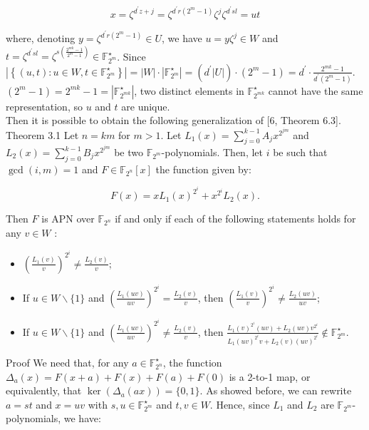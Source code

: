 \documentclass[10pt]{article}
\begin{document}
$$
x=\zeta^{d^{\prime} z+j}=\zeta^{d^{\prime} r\left(2^{m}-1\right)} \zeta^{j} \zeta^{d^{\prime} s l}=u t
$$

where, denoting $y=\zeta^{d^{\prime} r\left(2^{m}-1\right)} \in U$, we have $u=y \zeta^{j} \in W$ and $t=\zeta^{d^{\prime} s l}=\zeta^{s\left(\frac{2^{m k}-1}{2^{m}-1}\right)} \in \mathbb{F}_{2^{m}}^{\star}$. Since $\left|\left\{(u, t): u \in W, t \in \mathbb{F}_{2^{m}}^{\star}\right\}\right|=|W| \cdot\left|\mathbb{F}_{2^{m}}^{\star}\right|=\left(d^{\prime}|U|\right) \cdot\left(2^{m}-1\right)=d^{\prime} \cdot \frac{2^{m k}-1}{d^{\prime}\left(2^{m}-1\right)}$. $\left(2^{m}-1\right)=2^{m k}-1=\left|\mathbb{F}_{2^{m k}}^{\star}\right|$, two distinct elements in $\mathbb{F}_{2^{m k}}^{\star}$ cannot have the same representation, so $u$ and $t$ are unique.\\[0pt]
Then it is possible to obtain the following generalization of [6, Theorem 6.3].\\
Theorem 3.1 Let $n=k m$ for $m>1$. Let $L_{1}(x)=\sum_{j=0}^{k-1} A_{j} x^{2^{j m}}$ and $L_{2}(x)=\sum_{j=0}^{k-1} B_{j} x^{2^{j m}}$ be two $\mathbb{F}_{2^{m}}$-polynomials. Then, let $i$ be such that $\operatorname{gcd}(i, m)=1$ and $F \in \mathbb{F}_{2^{n}}[x]$ the function given by:


\begin{equation*}
F(x)=x L_{1}(x)^{2^{i}}+x^{2^{i}} L_{2}(x) . \tag{3}
\end{equation*}


Then $F$ is APN over $\mathbb{F}_{2^{n}}$ if and only if each of the following statements holds for any $v \in W$ :

\begin{itemize}
  \item $\left(\frac{L_{1}(v)}{v}\right)^{2^{i}} \neq \frac{L_{2}(v)}{v}$;
  \item If $u \in W \backslash\{1\}$ and $\left(\frac{L_{1}(u v)}{u v}\right)^{2^{i}}=\frac{L_{2}(v)}{v}$, then $\left(\frac{L_{1}(v)}{v}\right)^{2^{i}} \neq \frac{L_{2}(u v)}{u v}$;
  \item If $u \in W \backslash\{1\}$ and $\left(\frac{L_{1}(u v)}{u v}\right)^{2^{i}} \neq \frac{L_{2}(v)}{v}$, then $\frac{L_{1}(v)^{2^{i}}(u v)+L_{2}(u v) v^{2^{i}}}{L_{1}(u v)^{2^{i}} v+L_{2}(v)(u v)^{2^{i}}} \notin \mathbb{F}_{2^{m}}^{\star}$.
\end{itemize}

Proof We need that, for any $a \in \mathbb{F}_{2^{n}}^{\star}$, the function $\Delta_{a}(x)=F(x+a)+F(x)+F(a)+ F(0)$ is a 2-to-1 map, or equivalently, that $\operatorname{ker}\left(\Delta_{a}(a x)\right)=\{0,1\}$. As showed before, we can rewrite $a=s t$ and $x=u v$ with $s, u \in \mathbb{F}_{2^{m}}^{\star}$ and $t, v \in W$. Hence, since $L_{1}$ and $L_{2}$ are $\mathbb{F}_{2^{m}}$-polynomials, we have:
\end{document}
